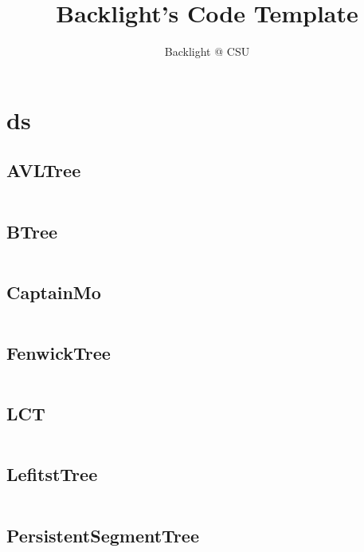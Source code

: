 \documentclass[a4]{article}
\title{\CJKfamily{hei} \bfseries Backlight's Code Template}
\author{Backlight @ CSU}
\begin{document}
\small
\begin{titlepage}
  \maketitle
\end{titlepage}

\newpage
\pagestyle{empty}
\renewcommand{\contentsname}{目录}
\tableofcontents
\newpage\clearpage
\newpage
\pagestyle{fancy}
\setcounter{page}{1}   %



\section{ds}
\subsection{AVLTree}
\inputminted[mathescape,linenos,numbersep=5pt,frame=lines,framesep=2mm]{cpp}{src/ds/AVLTree.cpp}
\subsection{BTree}
\inputminted[mathescape,linenos,numbersep=5pt,frame=lines,framesep=2mm]{cpp}{src/ds/BTree.cpp}
\subsection{CaptainMo}
\inputminted[mathescape,linenos,numbersep=5pt,frame=lines,framesep=2mm]{cpp}{src/ds/CaptainMo.cpp}
\subsection{FenwickTree}
\inputminted[mathescape,linenos,numbersep=5pt,frame=lines,framesep=2mm]{cpp}{src/ds/FenwickTree.cpp}
\subsection{LCT}
\inputminted[mathescape,linenos,numbersep=5pt,frame=lines,framesep=2mm]{cpp}{src/ds/LCT.cpp}
\subsection{LefitstTree}
\inputminted[mathescape,linenos,numbersep=5pt,frame=lines,framesep=2mm]{cpp}{src/ds/LefitstTree.cpp}
\subsection{PersistentSegmentTree}
\inputminted[mathescape,linenos,numbersep=5pt,frame=lines,framesep=2mm]{cpp}{src/ds/PersistentSegmentTree.cpp}
\end{document}
